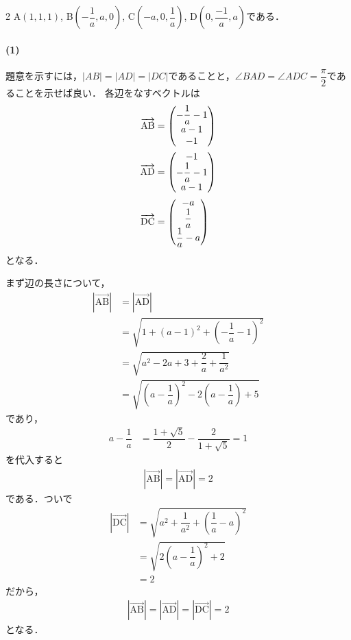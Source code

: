 \documentclass[../../main.tex]{subfiles}
\begin{document}
\begin{multicols}{2}
  A$(1,1,1)$, B$(-\dfrac{1}{a},a,0)$, C$(-a,0,\dfrac{1}{a})$, D$(0,\dfrac{-1}{a},a)$である．

  \paragraph{(1)}
  題意を示すには，$|AB|=|AD|=|DC|$であることと，$\angle BAD = \angle ADC = \dfrac{\pi}{2}$であることを示せば良い．
  各辺をなすベクトルは
  \begin{align}
    \overrightarrow{\text{AB}} & = \mqty( -\dfrac{1}{a}-1 \\ a-1 \\ -1) \\
    \overrightarrow{\text{AD}} & = \mqty( -1             \\ -\dfrac{1}{a}-1 \\ a-1 ) \\
    \overrightarrow{\text{DC}} & = \mqty(-a              \\ \dfrac{1}{a} \\ \dfrac{1}{a}-a )
  \end{align}
  となる．

  まず辺の長さについて，
  \begin{align}
    |\overrightarrow{\text{AB}}|
    & = |\overrightarrow{\text{AD}}|                                                   \\
    & = \sqrt{1+(a-1)^2+\left(-\dfrac{1}{a}-1\right)^2}                      \\
    & = \sqrt{a^2 -2a + 3 + \dfrac{2}{a} + \dfrac{1}{a^2}}                    \\
    & = \sqrt{\left(a-\dfrac{1}{a}\right)^2 - 2\left(a-\dfrac{1}{a}\right)+5}
  \end{align}
  であり，
  \begin{align}
    a-\dfrac{1}{a}
    & = \dfrac{1+\sqrt{5}}{2} - \dfrac{2}{1+\sqrt{5}}
    = 1 \label{eq:1}
  \end{align}
  を代入すると
  \begin{align}
    |\overrightarrow{\text{AB}}| = |\overrightarrow{\text{AD}}|   = 2
  \end{align}
  である．ついで
  \begin{align}
    |\overrightarrow{\text{DC}}|
    & = \sqrt{a^2+\dfrac{1}{a^2}+\left(\dfrac{1}{a}-a\right)^2} \\
    & = \sqrt{2\left(a-\dfrac{1}{a}\right)^2+2}                \\
    & = 2
  \end{align}
  だから，
  \begin{align}
    |\overrightarrow{\text{AB}}| = |\overrightarrow{\text{AD}}| =|\overrightarrow{\text{DC}}| = 2
  \end{align}
  となる．


\end{multicols}
\end{document}
